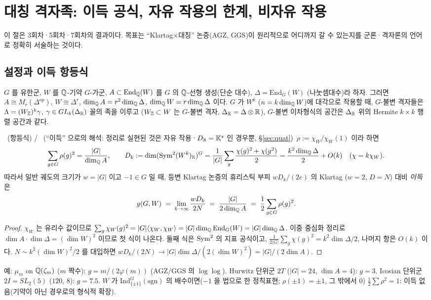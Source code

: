 \section{대칭 격자족: 이득 공식, 자유 작용의 한계, 비자유 작용}\label{sec:sym}

이 절은 3회차·5회차·7회차의 결과이다. 목표는 ``Klartag$\times$대칭'' 논증(AGZ, GGS)이 원리적으로 어디까지 갈 수 있는지를 군론·격자론의 언어로 정확히 서술하는 것이다.

\subsection{설정과 이득 항등식}
$G$ 를 유한군, $W$ 를 $\mathbb{Q}$-기약 $G$-가군, $A\subset\mathrm{End}_{\mathbb{Q}}(W)$ 를 $G$ 의 $\mathbb{Q}$-선형 생성(단순 대수), $\Delta=\mathrm{End}_G(W)$ (나눗셈대수)라 하자. 그러면 $A\cong M_r(\Delta^{op})$, $W\cong\Delta^r$, $\dim_{\mathbb{Q}} A=r^2\dim_{\mathbb{Q}}\Delta$, $\dim_{\mathbb{Q}} W=r\dim_{\mathbb{Q}}\Delta$ 이다. $G$ 가 $W^k$ ($n=k\dim_{\mathbb{Q}} W$)에 대각으로 작용할 때, $G$-불변 격자들은 $\Lambda=(W_{\mathbb{Z}})^k\gamma$, $\gamma\in GL_k(\Delta_{\mathbb{R}})$ 꼴의 족을 이루고 ($W_{\mathbb{Z}}\subset W$ 는 $G$-불변 격자, $\Delta_{\mathbb{R}}=\Delta\otimes\mathbb{R}$), $G$-불변 이차형식의 공간은 $\Delta_{\mathbb{R}}$ 위의 Hermite $k\times k$ 행렬 공간과 같다.

\begin{proposition}[이득 항등식]\label{prop:gain}\tagP\ (항등식) / \tagH\ (``이득'' 으로의 해석: 정리로 실현된 것은 자유 작용·$D_{\mathbb{R}}=\mathbb K^s$ 인 경우뿐, \S\ref{sec:quat})\
$\rho:=\chi_W/\chi_W(1)$ 이라 하면
\[
\sum_{g\in G}\rho(g)^2=\frac{|G|}{\dim_{\mathbb{Q}} A},\qquad
D_k:=\dim(\mathrm{Sym}^2 (W^k)_{\mathbb{R}})^G=\frac1{|G|}\sum_{g}\frac{\chi(g)^2+\chi(g^2)}2=\frac{k^2\dim_{\mathbb{Q}}\Delta}{2}+O(k)\quad(\chi=k\chi_W).
\]
따라서 일반 궤도의 크기가 $w=|G|$ 이고 $-1\in G$ 일 때, 등변 Klartag 논증의 휴리스틱 부피 $wD_k/(2e)$ 의 Klartag ($w=2$, $D=N$) 대비 \emph{이득}은
\[
g(G,W)\;=\;\lim_{k\to\infty}\frac{wD_k}{2N}\;=\;\frac{|G|}{2\dim_{\mathbb{Q}} A}\;=\;\frac12\sum_{g\in G}\rho(g)^2 .
\]
\end{proposition}
\begin{proof}
$\chi_W$ 는 유리수 값이므로 $\sum_g\chi_W(g)^2=|G|\langle\chi_W,\chi_W\rangle=|G|\dim_{\mathbb{Q}}\mathrm{End}_G(W)=|G|\dim_{\mathbb{Q}}\Delta$. 이중 중심화 정리로 $\dim A\cdot\dim\Delta=(\dim W)^2$ 이므로 첫 식이 나온다. 둘째 식은 $\mathrm{Sym}^2$ 의 지표 공식이고, $\frac1{2|G|}\sum_g\chi(g)^2=k^2\dim\Delta/2$, 나머지 항은 $O(k)$ 이다. $N\sim k^2(\dim W)^2/2$ 를 대입하면 $wD_k/(2N)\to|G|\dim\Delta/(2(\dim W)^2)=|G|/(2\dim A)$.
\end{proof}
예: $\mu_m$ on $\mathbb{Q}(\zeta_m)$ ($m$ 짝수): $g=m/(2\varphi(m))$ (AGZ/GGS 의 $\log\log$). Hurwitz 단위군 $2T$ ($|G|=24$, $\dim A=4$): $g=3$. Icosian 단위군 $2I=SL_2(5)$ ($120$, $8$): $g=7.5$. $W$ 가 $\mathrm{Ind}_{\{\pm1\}}^G(\mathrm{sgn})$ 의 배수이면($-1$ 을 법으로 한 정칙표현; $\rho(\pm1)=\pm1$, 그 밖에서 0) $\tfrac12\sum\rho^2=1$: 이득 없음(기약이 아닌 경우로의 형식적 확장).

